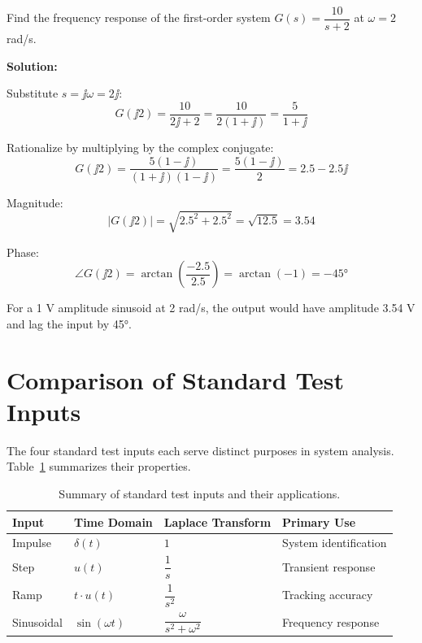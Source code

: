 \begin{examplebox}[title=Example 6.4: Frequency Response Calculation]
Find the frequency response of the first-order system $G(s) = \dfrac{10}{s + 2}$ at $\omega = 2$ rad/s.

\textbf{Solution:}

Substitute $s = \jj\omega = 2\jj$:
\begin{equation}
G(\jj 2) = \frac{10}{2\jj + 2} = \frac{10}{2(1 + \jj)} = \frac{5}{1 + \jj}
\end{equation}

Rationalize by multiplying by the complex conjugate:
\begin{equation}
G(\jj 2) = \frac{5(1 - \jj)}{(1 + \jj)(1 - \jj)} = \frac{5(1 - \jj)}{2} = 2.5 - 2.5\jj
\end{equation}

Magnitude:
\begin{equation}
|G(\jj 2)| = \sqrt{2.5^2 + 2.5^2} = \sqrt{12.5} = 3.54
\end{equation}

Phase:
\begin{equation}
\angle G(\jj 2) = \arctan\left(\frac{-2.5}{2.5}\right) = \arctan(-1) = -45°
\end{equation}

For a 1 V amplitude sinusoid at 2 rad/s, the output would have amplitude 3.54 V and lag the input by 45°.
\end{examplebox}

\section{Comparison of Standard Test Inputs}
\label{sec:comparison}

The four standard test inputs each serve distinct purposes in system analysis. Table~\ref{tab:test_inputs} summarizes their properties.

\begin{table}[htbp]
\centering
\begin{tabular}{llll}
\toprule
\textbf{Input} & \textbf{Time Domain} & \textbf{Laplace Transform} & \textbf{Primary Use} \\
\midrule
Impulse & $\delta(t)$ & $1$ & System identification \\
Step & $u(t)$ & $\dfrac{1}{s}$ & Transient response \\
Ramp & $t \cdot u(t)$ & $\dfrac{1}{s^2}$ & Tracking accuracy \\
Sinusoidal & $\sin(\omega t)$ & $\dfrac{\omega}{s^2 + \omega^2}$ & Frequency response \\
\bottomrule
\end{tabular}
\caption{Summary of standard test inputs and their applications.}
\label{tab:test_inputs}
\end{table}

